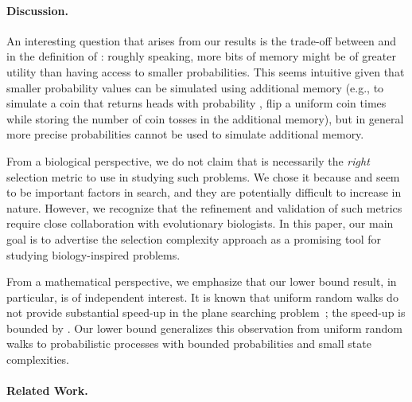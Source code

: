 \documentclass[11pt]{article}
\begin{document}
  \paragraph{Discussion.}
  An interesting question that arises from our results is the trade-off between  and  in the definition of : roughly speaking, more bits of memory might be of greater utility than having access to smaller probabilities. This seems intuitive given that smaller probability values can be simulated using additional memory  (e.g., to simulate a coin that returns heads with probability , flip a uniform coin  times while storing the number of coin tosses in the additional memory), but in general more precise probabilities cannot be used to simulate additional memory.
  
From a biological perspective, we do not claim that  is necessarily the {\em right} selection metric to use in studying such problems. We chose it because  and  seem to be important factors in search, and  they are potentially difficult to increase in nature. However, we recognize that the refinement and validation of such metrics require close collaboration with evolutionary biologists. In this paper, our main goal is to advertise the selection complexity approach as a promising tool for studying biology-inspired problems.

From a mathematical perspective, we emphasize that our lower bound result, in particular, is of independent interest. It is known that uniform random walks do not provide substantial speed-up in the plane searching problem~\cite{alon08}; the speed-up is bounded by . Our lower bound generalizes this observation from uniform random walks to probabilistic processes with bounded probabilities and small state complexities. 
 
\paragraph{Related Work.}
\end{document}
